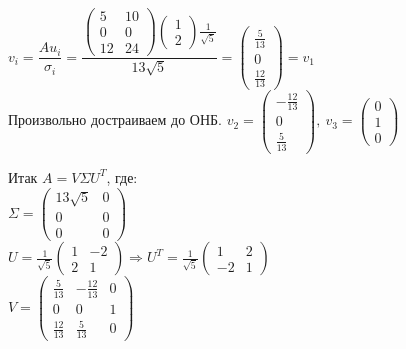 \documentclass[12pt, letterpaper, twoside]{article}
\begin{document}
\begin{enumerate}
    $v_i = \dfrac{A u_i}{\sigma_i} = \dfrac{\begin{pmatrix} 5 & 10\\ 0 & 0\\ 12 & 24 \end{pmatrix} \begin{pmatrix} 1\\ 2 \end{pmatrix} \frac{1}{\sqrt{5}} }{13\sqrt{5}} = \begin{pmatrix}
        \frac{5}{13}\\ 0 \\ \frac{12}{13}
    \end{pmatrix} = v_1$\\
    Произвольно достраиваем до ОНБ. $v_2 = \begin{pmatrix}
        -\frac{12}{13} \\ 0 \\ \frac{5}{13}
    \end{pmatrix},\ v_3 = \begin{pmatrix}
        0\\ 1\\ 0
    \end{pmatrix}$
\end{enumerate}
Итак $A = V\Sigma U^T$, где:\\
$\Sigma = \begin{pmatrix}
    13\sqrt{5} & 0\\
    0 & 0\\
    0 & 0
\end{pmatrix}$\\
$U = \frac{1}{\sqrt{5}}\begin{pmatrix}
    1 & -2\\
    2 & 1
\end{pmatrix}\Rightarrow U^T = \frac{1}{\sqrt{5}}\begin{pmatrix}
    1 & 2\\
    -2 & 1
\end{pmatrix}$\\
$V = \begin{pmatrix}
    \frac{5}{13} & -\frac{12}{13} & 0\\
    0 & 0 & 1\\
    \frac{12}{13} & \frac{5}{13} & 0
\end{pmatrix}$
\end{document}
